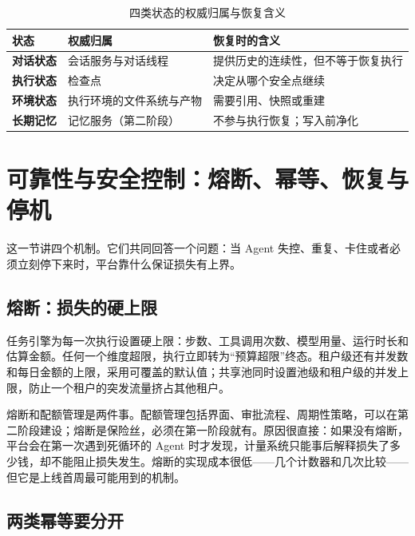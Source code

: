 \begin{table}[htbp]
\centering
\caption{四类状态的权威归属与恢复含义}
\label{tab:state-owner}
\begin{tabularx}{\textwidth}{@{}>{\bfseries}L{2.6cm}L{4.8cm}Y@{}}
  \toprule
  \textbf{状态} & \textbf{权威归属} & \textbf{恢复时的含义}\\
  \midrule
  对话状态 & 会话服务与对话线程 & 提供历史的连续性，但不等于恢复执行\\
  执行状态 & 检查点 & 决定从哪个安全点继续\\
  环境状态 & 执行环境的文件系统与产物 & 需要引用、快照或重建\\
  长期记忆 & 记忆服务（第二阶段） & 不参与执行恢复；写入前净化\\
  \bottomrule
\end{tabularx}
\end{table}

\section{可靠性与安全控制：熔断、幂等、恢复与停机}
\label{sec:reliability}

这一节讲四个机制。它们共同回答一个问题：当 Agent 失控、重复、卡住或者必须立刻停下来时，平台靠什么保证损失有上界。

\subsection{熔断：损失的硬上限}

任务引擎为每一次执行设置硬上限：步数、工具调用次数、模型用量、运行时长和估算金额。任何一个维度超限，执行立即转为“预算超限”终态。租户级还有并发数和每日金额的上限，采用可覆盖的默认值；共享池同时设置池级和租户级的并发上限，防止一个租户的突发流量挤占其他租户。

熔断和配额管理是两件事。配额管理包括界面、审批流程、周期性策略，可以在第二阶段建设；熔断是保险丝，必须在第一阶段就有。原因很直接：如果没有熔断，平台会在第一次遇到死循环的 Agent 时才发现，计量系统只能事后解释损失了多少钱，却不能阻止损失发生。熔断的实现成本很低——几个计数器和几次比较——但它是上线首周最可能用到的机制。

\subsection{两类幂等要分开}

